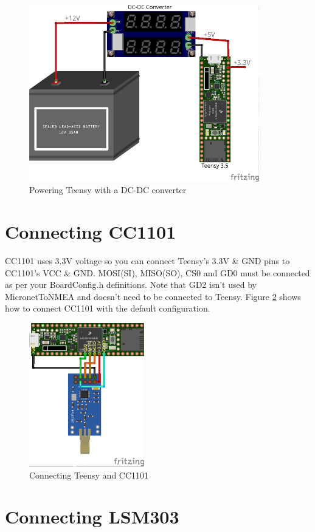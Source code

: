 \documentclass{report}
\begin{document}
\begin{figure}
\centering

\includegraphics[width=100mm]{MicronetToNMEA_DC_Power.png}
	\caption{Powering Teensy with a DC-DC converter}
\label{figure:dcpower}
\end{figure}

\section{Connecting CC1101}

CC1101 uses 3.3V voltage so you can connect Teensy's 3.3V \& GND pins to CC1101's VCC \& GND. MOSI(SI), MISO(SO), CS0 and GD0 must be connected as per your BoardConfig.h definitions. Note that GD2 isn't used by MicronetToNMEA and doesn't need to be connected to Teensy. Figure \ref{figure:cc1101} shows how to connect CC1101 with the default configuration.

\begin{figure}[h]
	\centering
	\includegraphics[width=50mm]{MicronetToNMEA_CC1101.png}
	\caption{Connecting Teensy and CC1101}
	\label{figure:cc1101}
\end{figure}

\section{Connecting LSM303}
\end{document}
